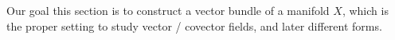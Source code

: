 \documentclass[../main-v2-manifolds.tex]{subfiles}
\begin{document}



% 

Our goal this section is to construct a vector bundle of a manifold $X$, which is the proper setting to study vector / covector fields, and later different forms. %



\end{document}
